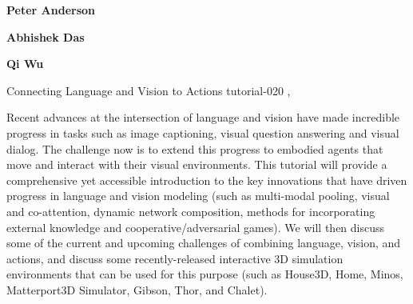 \begin{bio}
{\bfseries Peter Anderson} 

{\bfseries Abhishek Das} 

{\bfseries Qi Wu} 

\end{bio}

\begin{tutorial}
  {Connecting Language and Vision to Actions}
  {tutorial-020}
  {\daydateyear, \tutorialmorningtime}
  {\TutLocD}

Recent advances at the intersection of language and vision have made incredible progress in tasks such as image captioning, visual question answering and visual dialog. The challenge now is to extend this progress to embodied agents that move and interact with their visual environments. This tutorial will provide a comprehensive yet accessible introduction to the key innovations that have driven progress in language and vision modeling (such as multi-modal pooling, visual and co-attention, dynamic network composition, methods for incorporating external knowledge and cooperative/adversarial games). We will then discuss some of the current and upcoming challenges of combining language, vision, and actions, and discuss some recently-released interactive 3D simulation environments that can be used for this purpose (such as House3D, Home, Minos, Matterport3D Simulator, Gibson, Thor, and Chalet).

\end{tutorial}

